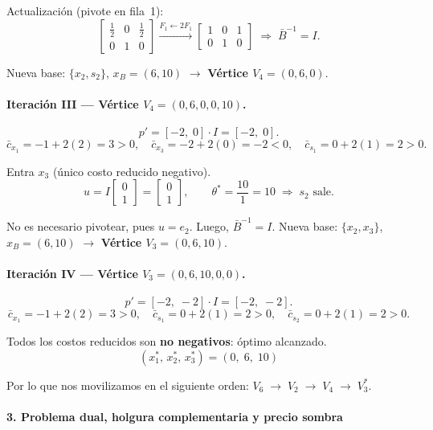 Actualización (pivote en fila~1):
\[
  \left[\begin{array}{cc|c}\frac{1}{2}&0&\frac{1}{2}\\0&1&0\end{array}\right]
  \xrightarrow{F_1\leftarrow 2F_1}
  \left[\begin{array}{cc|c}1&0&1\\0&1&0\end{array}\right]
  \;\Rightarrow\;
  \bar{B}^{-1}=I.
\]

Nueva base: $\{x_2,s_2\}$, $x_B=(6,10)$ $\to$ \textbf{Vértice $V_4=(0,6,0)$}.

\paragraph{Iteración III — Vértice $V_4=(0,6,0,0,10)$.}
\[
  p' = [-2,\;0]\cdot I = [-2,\;0].
\]
\[
  \bar c_{x_1} = -1+2(2) = 3>0,\quad
  \bar c_{x_3} = -2+2(0) = -2<0,\quad
  \bar c_{s_1} = 0+2(1) = 2>0.
\]

Entra $x_3$ (único costo reducido negativo).
\[
  u = I\begin{bmatrix}
      0 \\1
  \end{bmatrix} = \begin{bmatrix}
      0 \\1
  \end{bmatrix}, \qquad
  \theta^* = \frac{10}{1} = 10
  \;\Rightarrow\; s_2 \text{ sale}.
\]

No es necesario pivotear, pues $u=e_2$. Luego, $\bar{B}^{-1}=I$. Nueva base: $\{x_2,x_3\}$, $x_B=(6,10)$ $\to$ \textbf{Vértice $V_3=(0,6,10)$}.

\paragraph{Iteración IV — Vértice $V_3=(0,6,10,0,0)$.}
\[
  p' = [-2,\;-2]\cdot I = [-2,\;-2].
\]
\[
  \bar c_{x_1} = -1+2(2) = 3>0,\quad
  \bar c_{s_1} = 0+2(1) = 2>0,\quad
  \bar c_{s_2} = 0+2(1) = 2>0.
\]

Todos los costos reducidos son \textbf{no negativos}: óptimo alcanzado.
\[
  \boxed{(x_1^*,\,x_2^*,\,x_3^*) = (0,\;6,\;10)}
\]

Por lo que nos movilizamos en el siguiente orden: \quad $V_6\;\to\;V_2\;\to\;V_4\;\to\;V_3^*$.\\

\paragraph{3.\; Problema dual, holgura complementaria y precio sombra}

